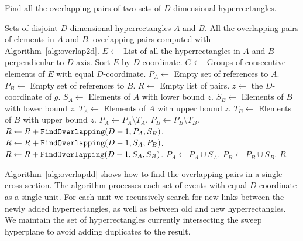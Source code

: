 \documentclass[english,gradu]{tktltiki2018}
\begin{document}
\begin{algorithm}
\caption{Find all the overlapping pairs of two sets of $D$-dimensional hyperrectangles.}
\label{alg:overlapdd}
\begin{algorithmic}
\Require Sets of disjoint $D$-dimensional hyperrectangles $A$ and $B$.
\Output All the overlapping pairs of elements in $A$ and $B$.
		\State \Return overlapping pairs computed with Algorithm~\ref{alg:overlap2d}.
	\EndIf
	\State $E\gets$ List of all the hyperrectangles in $A$ and $B$ perpendicular to $D$-axis.
	\State Sort $E$ by $D$-coordinate.
	\State $G\gets$ Groups of consecutive elements of $E$ with equal $D$-coordinate.
	\State $P_A\gets$ Empty set of references to $A$.
	\State $P_B\gets$ Empty set of references to $B$.
	\State $R\gets$ Empty list of pairs.
		\State $z\gets$ the $D$-coordinate of $g$.
		\State $S_A\gets$ Elements of $A$ with lower bound $z$.
		\State $S_B\gets$ Elements of $B$ with lower bound $z$.
		\State $T_A\gets$ Elements of $A$ with upper bound $z$.
		\State $T_B\gets$ Elements of $B$ with upper bound $z$.
		\State $P_A\gets P_A\setminus T_A$.
		\State $P_B\gets P_B\setminus T_B$.
		\State $R\gets R + \texttt{FindOverlapping}(D-1,P_A,S_B)$.
		\State $R\gets R + \texttt{FindOverlapping}(D-1,S_A,P_B)$.
		\State $R\gets R + \texttt{FindOverlapping}(D-1,S_A,S_B)$.
		\State $P_A\gets P_A\cup S_A$.
		\State $P_B\gets P_B\cup S_B$.
	\EndFor
	\State \Return $R$.
\EndProcedure
\end{algorithmic}
\end{algorithm}

Algorithm~\ref{alg:overlapdd} shows how to find the overlapping pairs in a single cross section.
The algorithm processes each set of events with equal $D$-coordinate as a single unit.
For each unit we recursively search for new links between the newly added hyperrectangles, as well as between old and new hyperrectangles.
We maintain the set of hyperrectangles currently intersecting the sweep hyperplane to avoid adding duplicates to the result.
\end{document}
